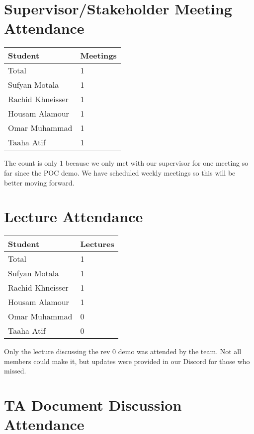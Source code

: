 \documentclass{article}
\begin{document}
\section{Supervisor/Stakeholder Meeting Attendance}

\begin{table}[H]
\centering
\begin{tabular}{ll}
\toprule
\textbf{Student} & \textbf{Meetings}\\
\midrule
Total & 1\\
Sufyan Motala & 1\\
Rachid Khneisser & 1\\
Housam Alamour & 1\\
Omar Muhammad & 1\\
Taaha Atif & 1\\
\bottomrule
\end{tabular}
\end{table}

The count is only 1 because we only met with our supervisor for one meeting so far since the POC demo. We have scheduled weekly meetings so this will be better moving forward.

\section{Lecture Attendance}

\begin{table}[H]
\centering
\begin{tabular}{ll}
\toprule
\textbf{Student} & \textbf{Lectures}\\
\midrule
Total & 1\\
Sufyan Motala & 1\\
Rachid Khneisser & 1\\
Housam Alamour & 1\\
Omar Muhammad & 0\\
Taaha Atif & 0\\
\bottomrule
\end{tabular}
\end{table}

Only the lecture discussing the rev 0 demo was attended by the team. Not all members could make it, but updates were provided in our Discord for those who missed.

\section{TA Document Discussion Attendance}
\end{document}
